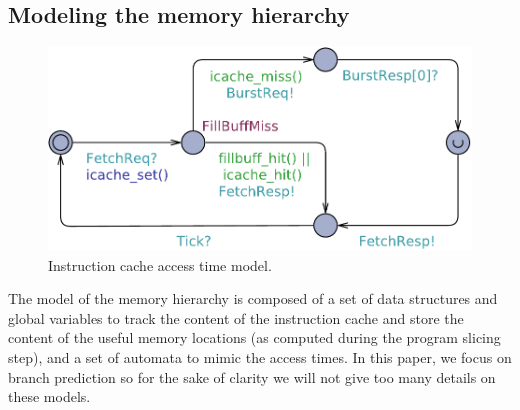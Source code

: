 

  \subsection{Modeling the memory hierarchy}
  \label{sec:model:memory}

    \begin{figure}
      \centering
      \includegraphics[scale=.5]{fig/icache}
      \caption{Instruction cache access time model.} \vspace{1em}
      \label{fig:icache-model}
    \end{figure}

    The model of the memory hierarchy is composed of a set of data structures and global variables to track the content of the instruction cache and store the content of the useful memory locations (as computed during the program slicing step), and a set of automata to mimic the access times.
    In this paper, we focus on branch prediction so for the sake of clarity we will not give too many details on these models. 

